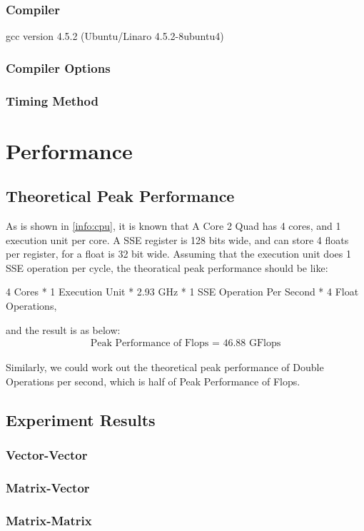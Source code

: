 \documentclass[a4paper]{report}   %
\begin{document}
\begin{CJK}{UTF8}{gbsn}
\subsection{Compiler} 
gcc version 4.5.2 (Ubuntu/Linaro 4.5.2-8ubuntu4)
\subsection{Compiler Options}

\subsection{Timing Method} 


\chapter{Performance}
\section{Theoretical Peak Performance}
As is shown in \ref{info:cpu}, it is known that A Core 2 Quad has 4 cores, and 1 execution unit per core. A SSE register is 128 bits wide, and can store 4 floats per register, for a float is 32 bit wide. Assuming that the execution unit does 1 SSE operation per cycle, the theoratical peak performance should be like:\

\begin{center} 
4 Cores * 1 Execution Unit * 2.93 GHz * 1 SSE Operation Per Second * 4 Float Operations, 
\end{center}

\noindent and the result is as below:
\begin{align}
\text{Peak Performance of Flops = 46.88 GFlops}
\end{align}

Similarly, we could work out the theoretical peak performance of Double Operations per second, which is half of Peak Performance of Flops. \cite{plain:myarticle}

\section{Experiment Results}
\subsection{Vector-Vector}

\subsection{Matrix-Vector}

\subsection{Matrix-Matrix}






\end{CJK}
\end{document}
